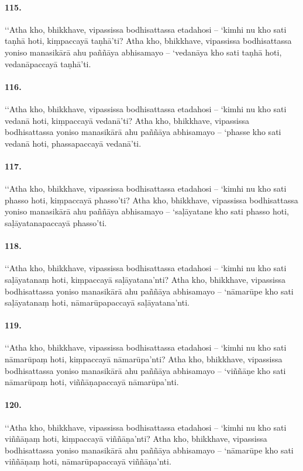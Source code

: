 \paragraph{115.} ‘‘Atha kho, bhikkhave, vipassissa bodhisattassa etadahosi – ‘kimhi nu kho sati taṇhā hoti, kiṃpaccayā taṇhā’ti? Atha kho, bhikkhave, vipassissa bodhisattassa yoniso manasikārā ahu paññāya abhisamayo – ‘vedanāya kho sati taṇhā hoti, vedanāpaccayā taṇhā’ti.

\paragraph{116.} ‘‘Atha kho, bhikkhave, vipassissa bodhisattassa etadahosi – ‘kimhi nu kho sati vedanā hoti, kiṃpaccayā vedanā’ti? Atha kho, bhikkhave, vipassissa bodhisattassa yoniso manasikārā ahu paññāya abhisamayo – ‘phasse kho sati vedanā hoti, phassapaccayā vedanā’ti.

\paragraph{117.} ‘‘Atha kho, bhikkhave, vipassissa bodhisattassa etadahosi – ‘kimhi nu kho sati phasso hoti, kiṃpaccayā phasso’ti? Atha kho, bhikkhave, vipassissa bodhisattassa yoniso manasikārā ahu paññāya abhisamayo – ‘saḷāyatane kho sati phasso hoti, saḷāyatanapaccayā phasso’ti.

\paragraph{118.} ‘‘Atha kho, bhikkhave, vipassissa bodhisattassa etadahosi – ‘kimhi nu kho sati saḷāyatanaṃ hoti, kiṃpaccayā saḷāyatana’nti? Atha kho, bhikkhave, vipassissa bodhisattassa yoniso manasikārā ahu paññāya abhisamayo – ‘nāmarūpe kho sati saḷāyatanaṃ hoti, nāmarūpapaccayā saḷāyatana’nti.

\paragraph{119.} ‘‘Atha kho, bhikkhave, vipassissa bodhisattassa etadahosi – ‘kimhi nu kho sati nāmarūpaṃ hoti, kiṃpaccayā nāmarūpa’nti? Atha kho, bhikkhave, vipassissa bodhisattassa yoniso manasikārā ahu paññāya abhisamayo – ‘viññāṇe kho sati nāmarūpaṃ hoti, viññāṇapaccayā nāmarūpa’nti.

\paragraph{120.} ‘‘Atha kho, bhikkhave, vipassissa bodhisattassa etadahosi – ‘kimhi nu kho sati viññāṇaṃ hoti, kiṃpaccayā viññāṇa’nti? Atha kho, bhikkhave, vipassissa bodhisattassa yoniso manasikārā ahu paññāya abhisamayo – ‘nāmarūpe kho sati viññāṇaṃ hoti, nāmarūpapaccayā viññāṇa’nti.

